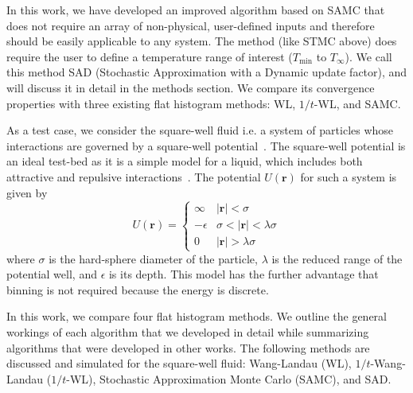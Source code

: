 \documentclass[letterpaper,twocolumn,amsmath,amssymb,pre,aps,10pt]{revtex4-1}
\begin{document}
In this work, we have developed an improved algorithm based on SAMC that does
not require an array of non-physical, user-defined inputs and therefore should
be easily applicable to any system. The method (like STMC above) does require
the user to define a temperature range of interest ($T_\text{min}$ to
$T_\infty$).  We call this method SAD (Stochastic Approximation with a Dynamic
update factor), and will discuss it in detail in the methods section. We compare
its convergence properties with three existing flat histogram methods: WL,
$1/t$-WL, and SAMC.

As a test case, we consider the square-well fluid i.e. a system of particles
whose interactions are governed by a square-well
potential~\cite{singh2003surface, barker2004perturbationSW}.  The square-well
potential is an ideal test-bed as it is a simple model for a liquid, which
includes both attractive and repulsive
interactions~\cite{barker1967-SW-perturbation, vega1992phase}.  The potential
$U(\textbf{r})$ for such a system is given by
\begin{equation}
 U(\textbf{r})=\begin{cases} \infty &
 \lvert\textbf{r}\rvert< \sigma\\-\epsilon &
 \sigma<\lvert\textbf{r}\rvert<\lambda\sigma\\0 &
 \lvert\textbf{r}\rvert > \lambda\sigma\end{cases}
\end{equation}
where $\sigma$ is the hard-sphere diameter of the particle, $\lambda$ is the
reduced range of the potential well, and $\epsilon$ is its depth. This model has
the further advantage that binning is not required because the energy is
discrete.


In this work, we compare four flat histogram methods.  We outline the
general workings of each algorithm that we developed in detail while
summarizing algorithms that were developed in other works.  The
following methods are discussed and simulated for the square-well
fluid: Wang-Landau (WL), $1/t$-Wang-Landau ($1/t$-WL), Stochastic
Approximation Monte Carlo (SAMC), and SAD.
\end{document}
